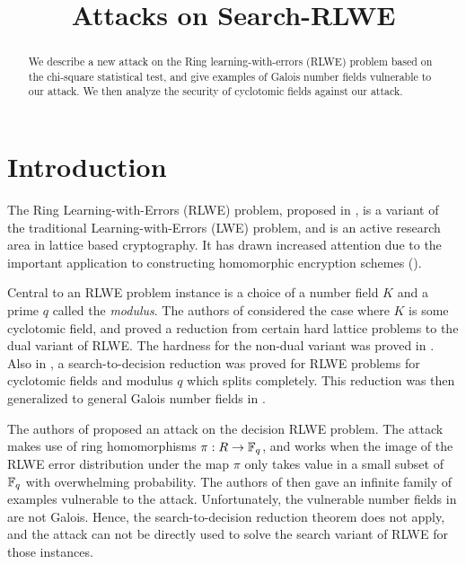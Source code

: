 \documentclass[envcountsame]{llncs}
\title{Attacks on Search-RLWE}
\begin{document}
\maketitle

\begin{abstract}
We describe a new attack on the Ring learning-with-errors (RLWE) problem based on the chi-square statistical test, and give examples of Galois number fields vulnerable to our attack. We then analyze the security of cyclotomic fields against our attack.

\end{abstract}

\section{Introduction}
The Ring Learning-with-Errors (RLWE) problem, proposed in \cite{lyubashevsky2013ideal}, is a variant of the traditional Learning-with-Errors (LWE) problem, and is an active research area in lattice based cryptography. It has drawn increased attention due to the important application  to constructing homomorphic encryption schemes (\cite{bos2013improved,brakerski2012leveled,brakerski2011fully,brakerski2014efficient,gentry2012fully,stehle2011making}).

Central to an RLWE problem instance is a choice of a number field $K$ and a prime $q$ called the {\it modulus}. The authors of \cite{lyubashevsky2013ideal} considered the case where $K$ is some cyclotomic field, and proved a reduction from certain hard lattice problems to the dual variant of RLWE. The hardness for the non-dual variant was proved in \cite{ducas2012ring}. Also in \cite{lyubashevsky2013ideal}, a search-to-decision reduction was proved for RLWE problems for cyclotomic fields and modulus $q$ which splits completely. This reduction was then generalized to general Galois number fields in \cite{eisentrager2014weak}.

The authors of \cite{elos2015weak} proposed an attack on the decision RLWE problem. The attack makes use of ring homomorphisms $\pi: R \to \mathbb{F}_q$, and works when the image of the RLWE error distribution under the map $\pi$ only takes value in a small subset of $\mathbb{F}_q$ with overwhelming probability. The authors of \cite{elos2015weak} then gave an infinite family of examples vulnerable to the attack. Unfortunately, the vulnerable number fields in \cite{elos2015weak} are not Galois. Hence, the search-to-decision reduction theorem does not apply, and the attack can not be directly used to solve the search variant of RLWE for those instances.
\end{document}
